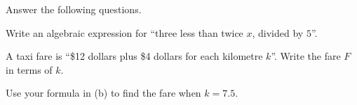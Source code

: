  Answer the following questions.
\begin{subparts}
  \item Write an algebraic expression for ``three less than twice $x$, divided by $5$''.
  \item A taxi fare is ``\$12 dollars plus \$4 dollars for each kilometre $k$''. Write the fare $F$ in terms of $k$.
  \item Use your formula in (b) to find the fare when $k=7.5$.
\end{subparts}
